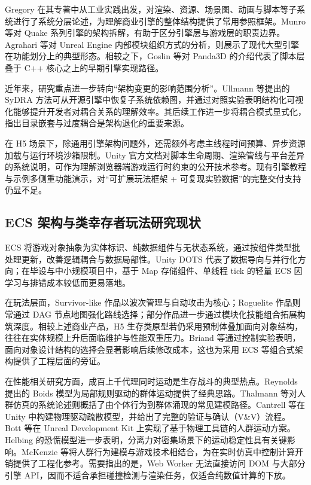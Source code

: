 Gregory 在其专著中从工业实践出发，对渲染、资源、场景图、动画与脚本等子系统进行了系统分层论述，为理解商业引擎的整体结构提供了常用参照框架\cite{gregory2018game}。Munro 等对 Quake 系列引擎的架构拆解，有助于区分引擎层与游戏层的职责边界\cite{munro2009quake}。Agrahari 等对 Unreal Engine 内部模块组织方式的分析，则展示了现代大型引擎在功能划分上的典型形态\cite{agrahari2021unreal}。相较之下，Goslin 等对 Panda3D 的介绍代表了脚本层叠于 C++ 核心之上的早期引擎实现路径\cite{goslin2004panda}。

近年来，研究重点进一步转向“架构变更的影响范围分析”。Ullmann 等提出的 SyDRA 方法可从开源引擎中恢复子系统依赖图，并通过对照实验表明结构化可视化能够提升开发者对耦合关系的理解效率\cite{ullmann2025sydra}。其后续工作进一步将耦合模式显式化，指出目录嵌套与过度耦合是架构退化的重要来源\cite{ullmann2023coupling}。

在 H5 场景下，除通用引擎架构问题外，还需额外考虑主线程时间预算、异步资源加载与运行环境沙箱限制。Unity 官方文档对脚本生命周期、渲染管线与平台差异的系统说明，可作为理解浏览器端游戏运行时约束的公开技术参考\cite{unitymanual2016}。现有引擎教程与示例多侧重功能演示，对“可扩展玩法框架 + 可复现实验数据”的完整交付支持仍显不足。

\subsection{ECS 架构与类幸存者玩法研究现状}

ECS 将游戏对象抽象为实体标识、纯数据组件与无状态系统，通过按组件类型批处理更新，改善逻辑耦合与数据局部性。Unity DOTS 代表了数据导向与并行化方向；在毕设与中小规模项目中，基于 Map 存储组件、单线程 tick 的轻量 ECS 因学习与排错成本较低而更易落地。

在玩法层面，Survivor-like 作品以波次管理与自动攻击为核心；Roguelite 作品则常通过 DAG 节点地图强化路线选择；部分作品进一步通过模块化技能组合拓展构筑深度。相较上述商业产品，H5 生存类原型若仍采用预制体叠加面向对象结构，往往在实体规模上升后面临维护与性能双重压力。Briand 等通过控制实验表明，面向对象设计结构的选择会显著影响后续修改成本\cite{briand2001maintainability}，这也为采用 ECS 等组合式架构提供了工程层面的旁证。

在性能相关研究方面，成百上千代理同时运动是生存战斗的典型热点。Reynolds 提出的 Boids 模型为局部规则驱动的群体运动提供了经典思路\cite{reynolds1987flocks}。Thalmann 等对人群仿真的系统论述则概括了由个体行为到群体涌现的常见建模路径\cite{thalmann2007crowd}。Cantrell 等在 Unity 中构建物理驱动疏散模型，并给出了完整的验证与确认（V\&V）流程\cite{cantrell2018unity}。Bott 等在 Unreal Development Kit 上实现了基于物理工具链的人群运动方案\cite{bott2014unreal}。Helbing 的恐慌模型进一步表明，分离力对密集场景下的运动稳定性具有关键影响\cite{helbing2000panic}。McKenzie 等将人群行为建模与游戏技术相结合，为在实时仿真中控制计算开销提供了工程化参考\cite{mckenzie2008crowd}。需要指出的是，Web Worker 无法直接访问 DOM 与大部分引擎 API，因而不适合承担碰撞检测与渲染任务，仅适合纯数值计算的下放。

